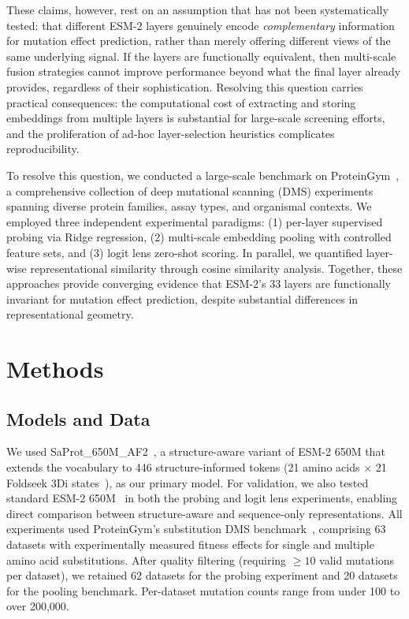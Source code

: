 \documentclass[11pt,a4paper]{article}
\begin{document}
These claims, however, rest on an assumption that has not been systematically tested:
that different ESM-2 layers genuinely encode \emph{complementary} information for
mutation effect prediction, rather than merely offering different views of the same
underlying signal. If the layers are functionally equivalent, then multi-scale fusion
strategies cannot improve performance beyond what the final layer already provides,
regardless of their sophistication. Resolving this question carries practical
consequences: the computational cost of extracting and storing embeddings from
multiple layers is substantial for large-scale screening efforts, and the
proliferation of ad-hoc layer-selection heuristics complicates reproducibility.

To resolve this question, we conducted a large-scale benchmark on ProteinGym~\cite{notin2024proteingym},
a comprehensive collection of deep mutational scanning (DMS) experiments spanning
diverse protein families, assay types, and organismal contexts. We employed
three independent experimental paradigms: (1) per-layer supervised probing via Ridge
regression, (2) multi-scale embedding pooling with controlled feature sets, and
(3) logit lens zero-shot scoring. In parallel, we quantified layer-wise representational
similarity through cosine similarity analysis. Together, these approaches provide
converging evidence that ESM-2's 33 layers are functionally invariant for mutation
effect prediction, despite substantial differences in representational geometry.

\section{Methods}

\subsection{Models and Data}

We used SaProt\_650M\_AF2~\cite{su2024saprot}, a structure-aware variant of ESM-2 650M
that extends the vocabulary to 446 structure-informed tokens (21 amino acids $\times$ 21
Foldseek 3Di states~\cite{vankempen2024foldseek}), as our primary model. For validation,
we also tested standard ESM-2 650M~\cite{lin2023evolutionary} in both the probing and
logit lens experiments, enabling direct comparison between structure-aware and
sequence-only representations. All experiments used ProteinGym's substitution DMS
benchmark~\cite{notin2024proteingym}, comprising 63 datasets with experimentally measured
fitness effects for single and multiple amino acid substitutions. After quality filtering
(requiring $\geq 10$ valid mutations per dataset), we retained 62 datasets for the probing
experiment and 20 datasets for the pooling benchmark. Per-dataset mutation counts range
from under 100 to over 200,000.
\end{document}
